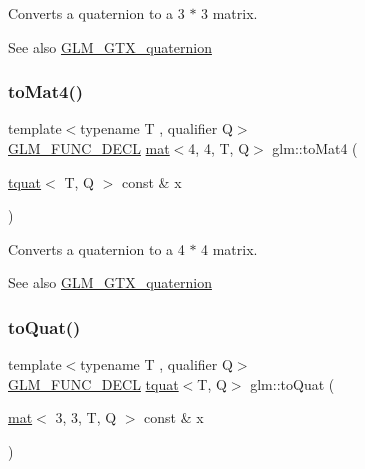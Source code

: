 Converts a quaternion to a 3 $\ast$ 3 matrix.

\begin{DoxySeeAlso}{See also}
\mbox{\hyperlink{group__gtx__quaternion}{G\+L\+M\+\_\+\+G\+T\+X\+\_\+quaternion}} 
\end{DoxySeeAlso}
\mbox{\label{group__gtx__quaternion_ga1fa0fb798c2715148e2e0358442bf895}} 
\subsubsection{\texorpdfstring{to\+Mat4()}{toMat4()}}
{\footnotesize\ttfamily template$<$typename T , qualifier Q$>$ \\
\mbox{\hyperlink{setup_8hpp_ab2d052de21a70539923e9bcbf6e83a51}{G\+L\+M\+\_\+\+F\+U\+N\+C\+\_\+\+D\+E\+CL}} \mbox{\hyperlink{structglm_1_1mat}{mat}}$<$4, 4, T, Q$>$ glm\+::to\+Mat4 (\begin{DoxyParamCaption}\item[{\mbox{\hyperlink{structglm_1_1tquat}{tquat}}$<$ T, Q $>$ const \&}]{x }\end{DoxyParamCaption})}

Converts a quaternion to a 4 $\ast$ 4 matrix.

\begin{DoxySeeAlso}{See also}
\mbox{\hyperlink{group__gtx__quaternion}{G\+L\+M\+\_\+\+G\+T\+X\+\_\+quaternion}} 
\end{DoxySeeAlso}
\mbox{\label{group__gtx__quaternion_gae9be791077b7a612d9092a922bd13f86}} 
\subsubsection{\texorpdfstring{to\+Quat()}{toQuat()}\hspace{0.1cm}{\footnotesize\ttfamily [1/2]}}
{\footnotesize\ttfamily template$<$typename T , qualifier Q$>$ \\
\mbox{\hyperlink{setup_8hpp_ab2d052de21a70539923e9bcbf6e83a51}{G\+L\+M\+\_\+\+F\+U\+N\+C\+\_\+\+D\+E\+CL}} \mbox{\hyperlink{structglm_1_1tquat}{tquat}}$<$T, Q$>$ glm\+::to\+Quat (\begin{DoxyParamCaption}\item[{\mbox{\hyperlink{structglm_1_1mat}{mat}}$<$ 3, 3, T, Q $>$ const \&}]{x }\end{DoxyParamCaption})}

